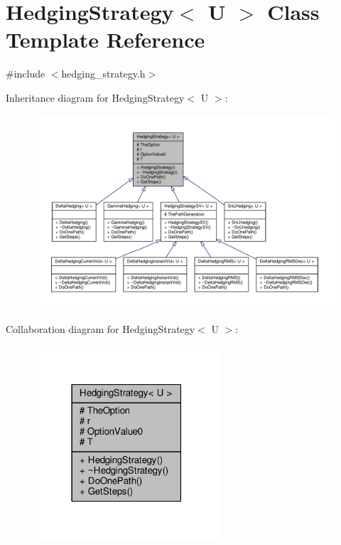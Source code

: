 \hypertarget{classHedgingStrategy}{}\section{Hedging\+Strategy$<$ U $>$ Class Template Reference}
\label{classHedgingStrategy}


{\ttfamily \#include $<$hedging\+\_\+strategy.\+h$>$}



Inheritance diagram for Hedging\+Strategy$<$ U $>$\+:
\nopagebreak
\begin{figure}[H]
\begin{center}
\leavevmode
\includegraphics[width=350pt]{classHedgingStrategy__inherit__graph}
\end{center}
\end{figure}


Collaboration diagram for Hedging\+Strategy$<$ U $>$\+:
\nopagebreak
\begin{figure}[H]
\begin{center}
\leavevmode
\includegraphics[width=195pt]{classHedgingStrategy__coll__graph}
\end{center}
\end{figure}
